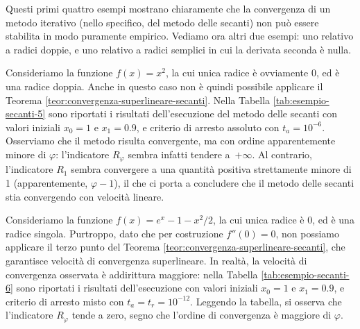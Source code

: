 Questi primi quattro esempi mostrano chiaramente che la convergenza
di un metodo iterativo (nello specifico, del metodo delle secanti)
non può essere stabilita in modo puramente empirico.
Vediamo ora altri due esempi: uno relativo a radici doppie,
e uno relativo a radici semplici in cui la derivata seconda è nulla.

\begin{esem}
Consideriamo la funzione $f(x) = x^2$, la cui unica radice è ovviamente
0, ed è una radice doppia. Anche in questo caso non è quindi possibile
applicare il Teorema \ref{teor:convergenza-superlineare-secanti}.
Nella Tabella \ref{tab:esempio-secanti-5} sono riportati i risultati
dell'esecuzione del metodo delle secanti con valori iniziali
$x_0 = 1$ e $x_1 = 0.9$, e criterio di arresto assoluto con $t_a = 10^{-6}$.
Osserviamo che il metodo risulta convergente, ma con ordine apparentemente
minore di $\varphi$: l'indicatore $R_\varphi$ sembra infatti tendere a~$+\infty$.
Al contrario, l'indicatore $R_1$ sembra convergere a una quantità positiva
strettamente minore di 1 (apparentemente, $\varphi-1$),
il che ci porta a concludere che il metodo delle
secanti stia convergendo con velocità lineare.
\end{esem}

\begin{esem}
Consideriamo la funzione $f(x) = e^x - 1 - x^2/2$, la cui unica radice è 0,
ed è una radice singola. Purtroppo, dato che per costruzione $f''(0) = 0$,
non possiamo applicare il terzo punto del
Teorema \ref{teor:convergenza-superlineare-secanti}, che garantisce
velocità di convergenza superlineare. In realtà, la velocità di convergenza
osservata è addirittura maggiore: nella Tabella \ref{tab:esempio-secanti-6}
sono riportati i risultati dell'esecuzione con valori iniziali
$x_0 = 1$ e $x_1 = 0.9$, e criterio di arresto misto con
$t_a = t_r = 10^{-12}$.
Leggendo la tabella, si osserva che l'indicatore $R_\varphi$ tende a zero,
segno che l'ordine di convergenza è maggiore di $	\varphi$.
\end{esem}


